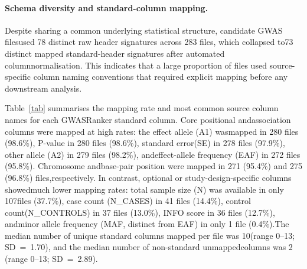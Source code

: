 \documentclass[11pt,a4paper]{article}
\begin{document}
\paragraph{Schema diversity and standard-column mapping.}Despite sharing a common underlying statistical structure, candidate GWAS filesused 78 distinct raw header signatures across 283 files, which collapsed to73 distinct mapped standard-header signatures after automated columnnormalisation. This indicates that a large proportion of files used source-specific column naming conventions that required explicit mapping before any downstream analysis.

Table~\ref{tab} summarises the mapping rate and most common source column names for each GWASRanker standard column. Core positional andassociation columns were mapped at high rates: the effect allele (A1) wasmapped in 280 files (98.6\%), P-value in 280 files (98.6\%), standard error(SE) in 278 files (97.9\%), other allele (A2) in 279 files (98.2\%), andeffect-allele frequency (EAF) in 272 files (95.8\%). Chromosome andbase-pair position were mapped in 271 (95.4\%) and 275 (96.8\%) files,respectively. In contrast, optional or study-design-specific columns showedmuch lower mapping rates: total sample size (N) was available in only 107files (37.7\%), case count (N\_CASES) in 41 files (14.4\%), control count(N\_CONTROLS) in 37 files (13.0\%), INFO score in 36 files (12.7\%), andminor allele frequency (MAF, distinct from EAF) in only 1 file (0.4\%).The median number of unique standard columns mapped per file was 10(range 0--13; SD~=~1.70), and the median number of non-standard unmappedcolumns was 2 (range 0--13; SD~=~2.89).
\end{document}
